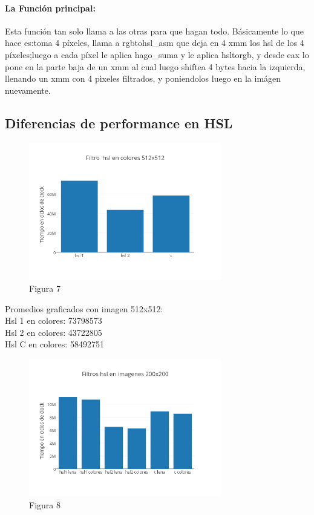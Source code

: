 \documentclass[a4paper]{article}
\begin{document}
\paragraph*{La Función principal:}

Esta función tan solo llama a las otras para que hagan todo. Básicamente lo que hace es:toma 4 píxeles, llama a rgbtohsl_asm que deja en 4 xmm los hsl de los 4 píxeles;luego a cada píxel le aplica hago_suma y le aplica hsltorgb, y desde eax lo pone en la parte baja de un xmm al cual luego shiftea 4 bytes hacia la izquierda, llenando un xmm con 4 pìxeles filtrados, y poniendolos luego en la imágen nuevamente.



\subsection{Diferencias de performance en HSL}

\begin{figure}[h]
  \centering
    \includegraphics[width=0.75\textwidth]{imagenes/FiltroHslEnColores512x512.png}
  \caption{Figura 7}
  \label{fig:graficohsl1}
\end{figure}
 \FloatBarrier

Promedios graficados con imagen 512x512:
\\

Hsl 1 en colores: 73798573
\\

Hsl 2 en colores: 43722805
\\

Hsl C en colores: 58492751

\begin{figure}[h]
  \centering
    \includegraphics[width=0.75\textwidth]{imagenes/FiltrosHslEnImagenes200x200.png}
  \caption{Figura 8}
  \label{fig:graficohsl2}
\end{figure}
 \FloatBarrier
\end{document}
